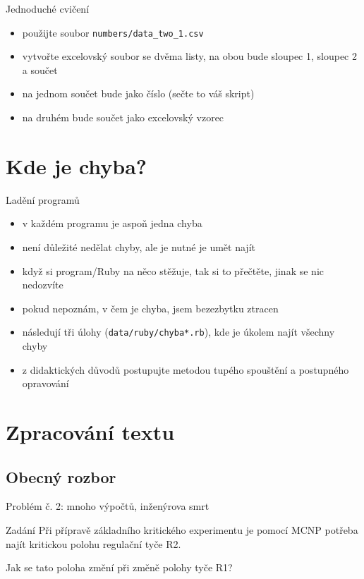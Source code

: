 \documentclass{beamer}
\begin{document}
\begin{frame}{Jednoduché cvičení}
  \begin{itemize}
    \item použijte soubor \texttt{numbers/data\_two\_1.csv}
    \item vytvořte excelovský soubor se dvěma listy, na obou bude sloupec 1, sloupec 2 a součet
    \item na jednom součet bude jako číslo (sečte to váš skript)
    \item na druhém bude součet jako excelovský vzorec
  \end{itemize}
\end{frame}


\section{Kde je chyba?}

\begin{frame}{Ladění programů}
  \begin{itemize}
    \item v každém programu je aspoň jedna chyba
    \item není důležité nedělat chyby, ale je nutné je umět najít
    \item když si program/Ruby na něco stěžuje, tak si to přečtěte, jinak se nic nedozvíte
    \item pokud nepoznám, v čem je chyba, jsem bezezbytku ztracen
    \item následují tři úlohy (\texttt{data/ruby/chyba*.rb}), kde je úkolem najít všechny chyby
    \item z didaktických důvodů postupujte metodou tupého spouštění a postupného opravování
  \end{itemize}
\end{frame}

\section{Zpracování textu}

\subsection{Obecný rozbor}

\begin{frame}{Problém č. 2: mnoho výpočtů, inženýrova smrt}
  \begin{block}{Zadání}
    Při přípravě základního kritického experimentu je pomocí MCNP potřeba najít kritickou polohu regulační tyče R2.

    Jak se tato poloha změní při změně polohy tyče R1?
  \end{block}
\end{frame}
\end{document}
